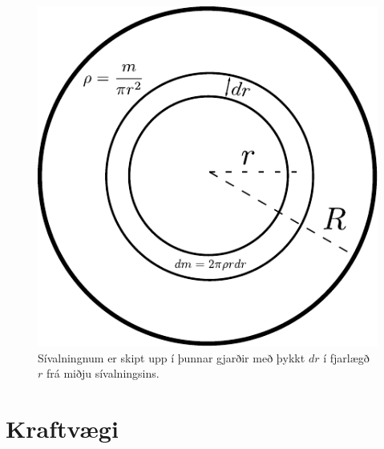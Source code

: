 \ifdefined \wholebook \else\documentclass[oneside]{book}\usepackage{EdlBook}\graphicspath{{figures/}}
\begin{document}
\begin{figure}[H]
    \centering
    \includegraphics[scale=0.6]{momentsOfInertia/sivalninertia.pdf}
    \caption{Sívalningnum er skipt upp í þunnar gjarðir með þykkt $dr$ í fjarlægð $r$ frá miðju sívalningsins.}
\end{figure}

\newpage

\section{Kraftvægi}
\end{document}
